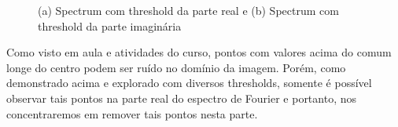 \documentclass{article}
\begin{document}
	\begin{figure}[H]
		\centering
		\qquad
		\caption{(a) Spectrum com threshold da parte real e (b) Spectrum com threshold da parte imaginária} 
	\end{figure}
	
	Como visto em aula e atividades do curso, pontos com valores acima do comum longe do centro podem ser ruído no domínio da imagem. Porém, como demonstrado acima e explorado com diversos thresholds, somente é possível observar tais pontos na parte real do espectro de Fourier e portanto, nos concentraremos em remover tais pontos nesta parte.
	
\end{document}
